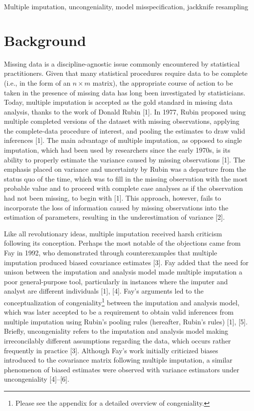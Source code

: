 \documentclass[
  letterpaper,
  DIV=11,
  numbers=noendperiod]{scrreprt}
\begin{document}
Multiple imputation, uncongeniality, model misspecification, jackknife
resampling


\hypertarget{background}{%
\chapter{Background}\label{background}}

Missing data is a discipline-agnostic issue commonly encountered by
statistical practitioners. Given that many statistical procedures
require data to be complete (i.e., in the form of an \(n \times m\)
matrix), the appropriate course of action to be taken in the presence of
missing data has long been investigated by statisticians. Today,
multiple imputation is accepted as the gold standard in missing data
analysis, thanks to the work of Donald Rubin {[}1{]}. In 1977, Rubin
proposed using multiple completed versions of the dataset with missing
observations, applying the complete-data procedure of interest, and
pooling the estimates to draw valid inferences {[}1{]}. The main
advantage of multiple imputation, as opposed to single imputation, which
had been used by researchers since the early 1970s, is its ability to
properly estimate the variance caused by missing observations {[}1{]}.
The emphasis placed on variance and uncertainty by Rubin was a departure
from the status quo of the time, which was to fill in the missing
observation with the most probable value and to proceed with complete
case analyses as if the observation had not been missing, to begin with
{[}1{]}. This approach, however, fails to incorporate the loss of
information caused by missing observations into the estimation of
parameters, resulting in the underestimation of variance {[}2{]}.

Like all revolutionary ideas, multiple imputation received harsh
criticism following its conception. Perhaps the most notable of the
objections came from Fay in 1992, who demonstrated through
counterexamples that multiple imputation produced biased covariance
estimates {[}3{]}. Fay added that the need for unison between the
imputation and analysis model made multiple imputation a poor
general-purpose tool, particularly in instances where the imputer and
analyst are different individuals {[}1{]}, {[}4{]}. Fay's arguments led
to the conceptualization of congeniality\footnote{Please see the
  appendix for a detailed overview of congeniality.} between the
imputation and analysis model, which was later accepted to be a
requirement to obtain valid inferences from multiple imputation using
Rubin's pooling rules (hereafter, Rubin's rules) {[}1{]}, {[}5{]}.
Briefly, uncongeniality refers to the imputation and analysis model
making irreconcilably different assumptions regarding the data, which
occurs rather frequently in practice {[}3{]}. Although Fay's work
initially criticized biases introduced to the covariance matrix
following multiple imputation, a similar phenomenon of biased estimates
were observed with variance estimators under uncongeniality
{[}4{]}--{[}6{]}.
\end{document}
